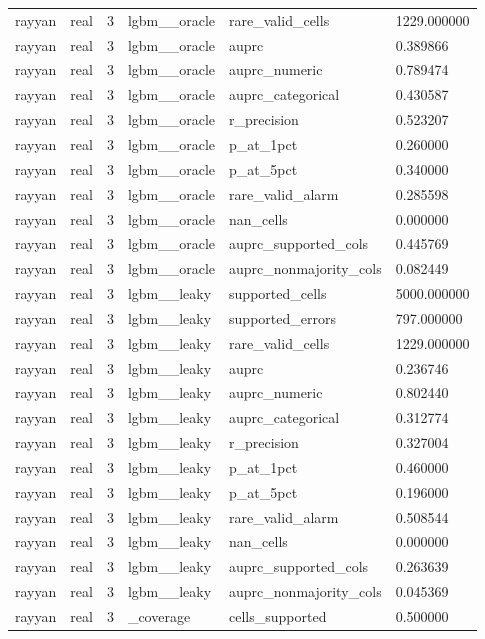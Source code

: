 \begin{tabular}{llllll}
rayyan & real & 3 & lgbm\_\_oracle & rare\_valid\_cells & 1229.000000 \\
rayyan & real & 3 & lgbm\_\_oracle & auprc & 0.389866 \\
rayyan & real & 3 & lgbm\_\_oracle & auprc\_numeric & 0.789474 \\
rayyan & real & 3 & lgbm\_\_oracle & auprc\_categorical & 0.430587 \\
rayyan & real & 3 & lgbm\_\_oracle & r\_precision & 0.523207 \\
rayyan & real & 3 & lgbm\_\_oracle & p\_at\_1pct & 0.260000 \\
rayyan & real & 3 & lgbm\_\_oracle & p\_at\_5pct & 0.340000 \\
rayyan & real & 3 & lgbm\_\_oracle & rare\_valid\_alarm & 0.285598 \\
rayyan & real & 3 & lgbm\_\_oracle & nan\_cells & 0.000000 \\
rayyan & real & 3 & lgbm\_\_oracle & auprc\_supported\_cols & 0.445769 \\
rayyan & real & 3 & lgbm\_\_oracle & auprc\_nonmajority\_cols & 0.082449 \\
rayyan & real & 3 & lgbm\_\_leaky & supported\_cells & 5000.000000 \\
rayyan & real & 3 & lgbm\_\_leaky & supported\_errors & 797.000000 \\
rayyan & real & 3 & lgbm\_\_leaky & rare\_valid\_cells & 1229.000000 \\
rayyan & real & 3 & lgbm\_\_leaky & auprc & 0.236746 \\
rayyan & real & 3 & lgbm\_\_leaky & auprc\_numeric & 0.802440 \\
rayyan & real & 3 & lgbm\_\_leaky & auprc\_categorical & 0.312774 \\
rayyan & real & 3 & lgbm\_\_leaky & r\_precision & 0.327004 \\
rayyan & real & 3 & lgbm\_\_leaky & p\_at\_1pct & 0.460000 \\
rayyan & real & 3 & lgbm\_\_leaky & p\_at\_5pct & 0.196000 \\
rayyan & real & 3 & lgbm\_\_leaky & rare\_valid\_alarm & 0.508544 \\
rayyan & real & 3 & lgbm\_\_leaky & nan\_cells & 0.000000 \\
rayyan & real & 3 & lgbm\_\_leaky & auprc\_supported\_cols & 0.263639 \\
rayyan & real & 3 & lgbm\_\_leaky & auprc\_nonmajority\_cols & 0.045369 \\
rayyan & real & 3 & \_coverage & cells\_supported & 0.500000 \\

\end{tabular}
